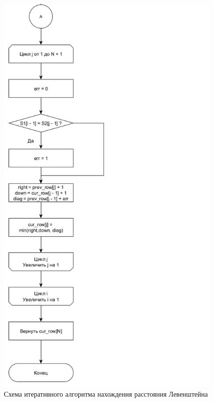 \documentclass[12pt]{report}
\begin{document}
\begin{figure}[h]
	\centering
	\includegraphics[scale=0.65]{matr_lev12.jpg}
	\caption{Схема итеративного алгоритма нахождения расстояния Левенштейна}
	\label{fig:mpr}
\end{figure}
\clearpage
\end{document}
